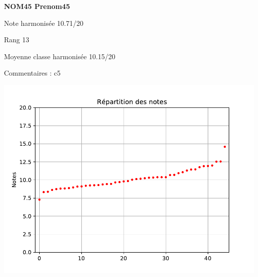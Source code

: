 \begin{minipage}[c]{.45\linewidth} 
\Large \textbf{\textsf{NOM45 Prenom45}} 
 
 \normalsize Note harmonisée 10.71/20 
 
Rang 13
 
Moyenne classe harmonisée 10.15/20 
 
Commentaires : 
c5 
\end{minipage}\hfill 
\begin{minipage}[c]{.45\linewidth}  
\begin{center}
\includegraphics[width=.8\linewidth]{histo.pdf} 
\end{center}
\end{minipage}
\footnotesize 
